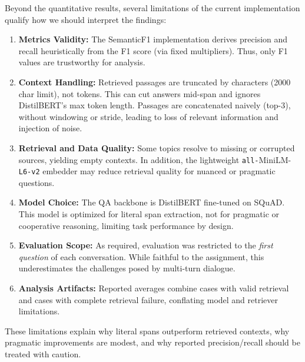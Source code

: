 \documentclass[12pt, letterpaper]{article}
\begin{document}
Beyond the quantitative results, several limitations of the current implementation qualify how we should interpret the findings:

\begin{enumerate}
    \item \textbf{Metrics Validity:} The SemanticF1 implementation derives precision and recall heuristically from the F1 score (via fixed multipliers). Thus, only F1 values are trustworthy for analysis.
    
    \item \textbf{Context Handling:} Retrieved passages are truncated by characters (2000 char limit), not tokens. This can cut answers mid-span and ignores DistilBERT's max token length. Passages are concatenated naively (top-3), without windowing or stride, leading to loss of relevant information and injection of noise.
    
    \item \textbf{Retrieval and Data Quality:} Some topics resolve to missing or corrupted sources, yielding empty contexts. In addition, the lightweight \texttt{all-}MiniLM-\texttt{L6-v2} embedder may reduce retrieval quality for nuanced or pragmatic questions.
    
    \item \textbf{Model Choice:} The QA backbone is DistilBERT fine-tuned on SQuAD. This model is optimized for literal span extraction, not for pragmatic or cooperative reasoning, limiting task performance by design.
    
    \item \textbf{Evaluation Scope:} As required, evaluation was restricted to the \emph{first question} of each conversation. While faithful to the assignment, this underestimates the challenges posed by multi-turn dialogue.
    
    \item \textbf{Analysis Artifacts:} Reported averages combine cases with valid retrieval and cases with complete retrieval failure, conflating model and retriever limitations.
\end{enumerate}

These limitations explain why literal spans outperform retrieved contexts, why pragmatic improvements are modest, and why reported precision/recall should be treated with caution.
\end{document}
